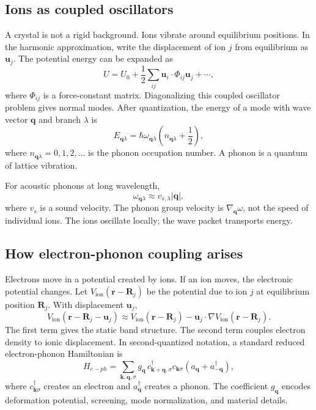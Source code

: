 \documentclass[11pt]{article}
\newcommand{\bk}{{\bm{k}}}
\newcommand{\br}{{\bm{r}}}
\newcommand{\bq}{{\bm{q}}}
\newcommand{\bu}{{\bm{u}}}
\newcommand{\bR}{{\bm{R}}}
\begin{document}
\subsection{Ions as coupled oscillators}
A crystal is not a rigid background. Ions vibrate around equilibrium positions. In the harmonic approximation, write the displacement of ion $j$ from equilibrium as $\bu_j$. The potential energy can be expanded as
\begin{equation}
 U=U_0+\frac{1}{2}\sum_{ij}\bu_i\cdot \Phi_{ij}\bu_j+\cdots,
\end{equation}
where $\Phi_{ij}$ is a force-constant matrix. Diagonalizing this coupled oscillator problem gives normal modes. After quantization, the energy of a mode with wave vector $\bq$ and branch $\lambda$ is
\begin{equation}
 E_{\bq\lambda}=\hbar\omega_{\bq\lambda}\left(n_{\bq\lambda}+\frac{1}{2}\right),
\end{equation}
where $n_{\bq\lambda}=0,1,2,\ldots$ is the phonon occupation number. A phonon is a quantum of lattice vibration.

For acoustic phonons at long wavelength,
\begin{equation}
 \omega_{\bq\lambda}\approx v_{s,\lambda}|\bq|,
\end{equation}
where $v_s$ is a sound velocity. The phonon group velocity is $\nabla_\bq\omega$, not the speed of individual ions. The ions oscillate locally; the wave packet transports energy.

\subsection{How electron-phonon coupling arises}
Electrons move in a potential created by ions. If an ion moves, the electronic potential changes. Let $V_{\mathrm{ion}}(\br-\bR_j)$ be the potential due to ion $j$ at equilibrium position $\bR_j$. With displacement $\bu_j$,
\begin{equation}
 V_{\mathrm{ion}}(\br-\bR_j-\bu_j)
 \approx V_{\mathrm{ion}}(\br-\bR_j)-\bu_j\cdot\nabla V_{\mathrm{ion}}(\br-\bR_j).
\end{equation}
The first term gives the static band structure. The second term couples electron density to ionic displacement. In second-quantized notation, a standard reduced electron-phonon Hamiltonian is
\begin{equation}
H_{e-ph}=\sum_{\bk,\bq,\sigma}g_{\bq}\,c_{\bk+\bq,\sigma}^{\dagger}c_{\bk\sigma}
\left(a_{\bq}+a_{-\bq}^{\dagger}\right),
\end{equation}
where $c_{\bk\sigma}^{\dagger}$ creates an electron and $a_{\bq}^{\dagger}$ creates a phonon. The coefficient $g_{\bq}$ encodes deformation potential, screening, mode normalization, and material details.
\end{document}
